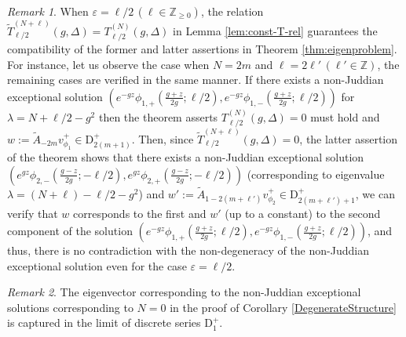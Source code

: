 \documentclass[11pt]{article}
\numberwithin{equation}{section}
\newcommand{\Z}{\mathbb{Z}} %
\newcommand{\e}{\varepsilon}
\newcommand{\RpnSymbol}[1]{\bm{\mathrm{#1}}}
\newcommand{\rD}{\RpnSymbol{D}}
\theoremstyle{plain}
\theoremstyle{definition}
\theoremstyle{remark}
\newtheorem{rem}{Remark}[section]
\begin{document}
\begin{rem}
  When $\e=\ell/2\,( \ell\in \Z_{\geq0})$, the relation $\tilde{T}_{\ell/2}^{(N+\ell)}(g,\Delta) =T_{\ell/2}^{(N)}(g,\Delta)$ in Lemma \ref{lem:const-T-rel} guarantees
  the compatibility of the former and latter assertions in Theorem \ref{thm:eigenproblem}. For instance, let us observe the case when $N=2m$ and
  $\ell=2\ell'\,(\ell'\in \Z)$, the remaining cases are verified in the same manner. If there exists a non-Juddian exceptional solution
  $(e^{-gz}\phi_{1,+}(\frac{g+z}{2g}; \ell/2), e^{-gz}\phi_{1,-}(\frac{g+z}{2g}; \ell/2))$ for $\lambda=N +\ell/2-g^2$  then the theorem asserts $T_{\ell/2}^{(N)}(g,\Delta)=0$
  must hold and $w:= \tilde{A}_{-2m} v^+_{\phi_1}\in \rD^+_{2(m+1)}$. Then, since $\tilde{T}_{\ell/2}^{(N+\ell)}(g,\Delta)=0$, the latter assertion of the theorem
  shows that there exists a non-Juddian exceptional solution $(e^{gz}\phi_{2,-}(\frac{g-z}{2g}; -\ell/2), e^{gz}\phi_{2,+}(\frac{g-z}{2g}; -\ell/2))$
  (corresponding to eigenvalue $\lambda=(N+\ell) -\ell/2 -g^2$) and $w':= \tilde{A}_{1-2(m+\ell')} v^+_{\phi_2}\in  \rD^+_{2(m+\ell')+ 1}$, we can verify that $w$
  corresponds to the first and $w'$ (up to a constant) to the second component of the solution
  $(e^{-gz}\phi_{1,+}(\frac{g+z}{2g}; \ell/2), e^{-gz}\phi_{1,-}(\frac{g+z}{2g}; \ell/2))$, and thus, there is no contradiction with the
  non-degeneracy of the non-Juddian exceptional solution even for the case $\e=\ell/2$.
\end{rem}


\begin{rem}
   The eigenvector corresponding to the non-Juddian exceptional solutions corresponding to $N=0$
   in the proof of Corollary \ref{DegenerateStructure} is captured in the limit of discrete series $\rD_1^+$.
\end{rem}
\end{document}
